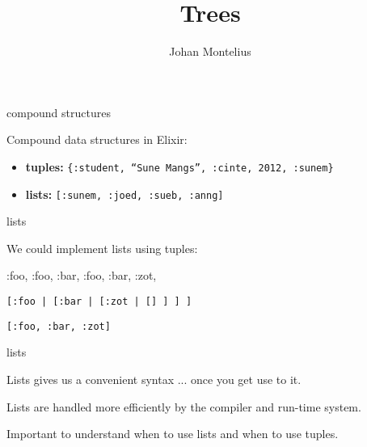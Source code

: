 

\title[ID1019 Trees]{Trees}


\author{Johan Montelius}
\date{\semester}



\begin{frame}
\titlepage
\end{frame}

\begin{frame}{compound structures}

Compound data structures in Elixir:

\begin{itemize}
 \item {\bf tuples:} {\tt \{:student, ``Sune Mangs'', :cinte, 2012,  :sunem\}}
 \item {\bf lists:} {\tt [:sunem, :joed, :sueb, :anng]}
\end{itemize}
\end{frame}


\begin{frame}{lists}

We could implement lists using tuples:
 
\pause

\begin{code}
  {}  
  {:foo, {}}
  {:foo, {:bar, {}}}
  {:foo, {:bar, {:zot, {}}}}
\end{code}

\pause \vspace{20pt}
{\tt [:foo | [:bar | [:zot | [] ] ] ] }

\pause \vspace{10pt}
{\tt [:foo, :bar, :zot]}

\end{frame}


\begin{frame}{lists}

\pause Lists gives us a convenient syntax ... \pause once you get use to it.
\vspace{20pt}

\pause Lists are handled more efficiently by the compiler and run-time system.

\vspace{20pt}
\pause Important to understand when to use lists and when to use tuples.

\end{frame}

